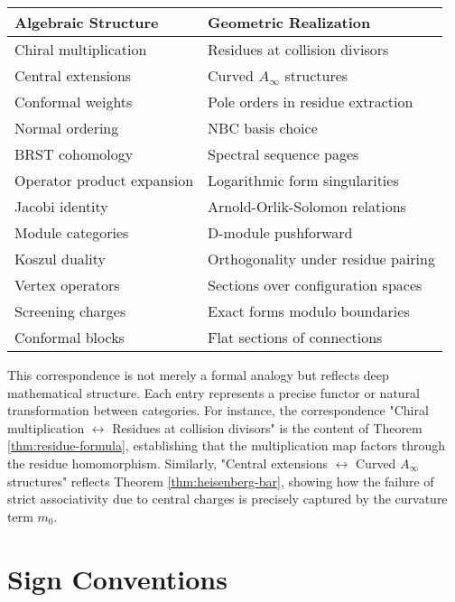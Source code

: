\begin{center}
\begin{tabular}{|l|l|}
\hline
\textbf{Algebraic Structure} & \textbf{Geometric Realization} \\
\hline
Chiral multiplication & Residues at collision divisors \\
Central extensions & Curved $A_\infty$ structures \\
Conformal weights & Pole orders in residue extraction \\
Normal ordering & NBC basis choice \\
BRST cohomology & Spectral sequence pages \\
Operator product expansion & Logarithmic form singularities \\
Jacobi identity & Arnold-Orlik-Solomon relations \\
Module categories & D-module pushforward \\
Koszul duality & Orthogonality under residue pairing \\
Vertex operators & Sections over configuration spaces \\
Screening charges & Exact forms modulo boundaries \\
Conformal blocks & Flat sections of connections \\
\hline
\end{tabular}
\end{center}

\begin{remark}
This correspondence is not merely a formal analogy but reflects deep mathematical structure. Each entry represents a precise functor or natural transformation between categories. For instance, the correspondence "Chiral multiplication $\leftrightarrow$ Residues at collision divisors" is the content of Theorem \ref{thm:residue-formula}, establishing that the multiplication map factors through the residue homomorphism. Similarly, "Central extensions $\leftrightarrow$ Curved $A_\infty$ structures" reflects Theorem \ref{thm:heisenberg-bar}, showing how the failure of strict associativity due to central charges is precisely captured by the curvature term $m_0$.
\end{remark}


 
\section{Sign Conventions}
 
